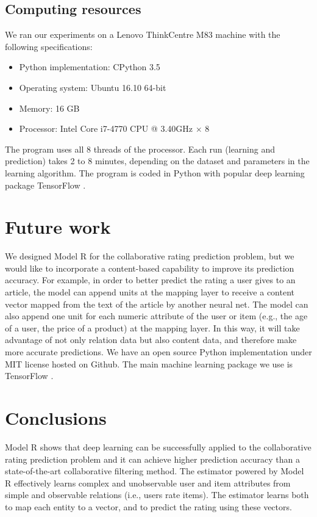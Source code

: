 \documentclass[sigconf]{acmart}
\begin{document}
\subsection{Computing resources}
We ran our experiments on a Lenovo ThinkCentre M83 machine with the following specifications:
\begin{itemize}
	\item Python implementation: CPython 3.5
	\item Operating system: Ubuntu 16.10 64-bit
	\item Memory: 16 GB
	\item Processor: Intel Core i7-4770 CPU @ 3.40GHz $ \times $ 8
\end{itemize}
The program uses all 8 threads of the processor.
Each run (learning and prediction) takes 2 to 8 minutes,
depending on the dataset and parameters in the learning algorithm.
The program is coded in Python
with popular deep learning package TensorFlow \cite{abadi2016tensorflow}.

\section{Future work}
We designed Model R for the collaborative rating prediction problem,
but we would like to incorporate a content-based capability to improve its 
prediction accuracy.
For example, in order to better predict the rating a user gives to an article,
the model can append units at the mapping layer to receive a content vector 
mapped from the text of the article by another neural net.
The model can also append one unit for each numeric attribute of the user or 
item (e.g., the age of a user, the price of a product) at the mapping layer.
In this way, it will take advantage of not only relation data but also content 
data, and therefore make more accurate predictions.
We have an open source Python implementation under MIT license hosted on Github.
The main machine learning package we use is TensorFlow 
\cite{abadi2016tensorflow}.

\section{Conclusions}
Model R shows that deep learning can be successfully applied to the 
collaborative rating prediction problem
and it can achieve higher prediction accuracy than a state-of-the-art 
collaborative filtering method.
The estimator powered by Model R effectively learns complex and unobservable 
user and item attributes from simple and observable relations (i.e., users rate 
items).
The estimator learns both to map each entity to a vector, and to predict 
the rating using these vectors.



\end{document}
